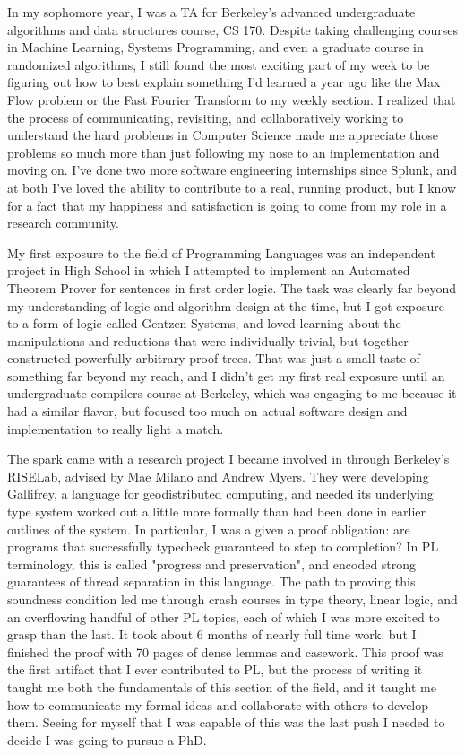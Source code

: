 \documentclass{nsf-grfp}
\begin{document}
In my sophomore year, I was a TA for Berkeley's advanced undergraduate algorithms and data structures course, CS 170. Despite taking challenging courses in Machine Learning, Systems Programming, and even a graduate course in randomized algorithms, I still found the most exciting part of my week to be figuring out how to best explain something I'd learned a year ago like the Max Flow problem or the Fast Fourier Transform to my weekly section. I realized that the process of communicating, revisiting, and collaboratively working to understand the hard problems in Computer Science made me appreciate those problems so much more than just following my nose to an implementation and moving on. I've done two more software engineering internships since Splunk, and at both I've loved the ability to contribute to a real, running product, but I know for a fact that my happiness and satisfaction is going to come from my role in a research community.

My first exposure to the field of Programming Languages was an independent project in High School in which I attempted to implement an Automated Theorem Prover for sentences in first order logic. The task was clearly far beyond my understanding of logic and algorithm design at the time, but I got exposure to a form of logic called Gentzen Systems, and loved learning about the manipulations and reductions that were individually trivial, but together constructed powerfully arbitrary proof trees. That was just a small taste of something far beyond my reach, and I didn't get my first real exposure until an undergraduate compilers course at Berkeley, which was engaging to me because it had a similar flavor, but focused too much on actual software design and implementation to really light a match. 

The spark came with a research project I became involved in through Berkeley's RISELab, advised by Mae Milano and Andrew Myers. They were developing Gallifrey, a language for geodistributed computing, and needed its underlying type system worked out a little more formally than had been done in earlier outlines of the system. In particular, I was a given a proof obligation: are programs that successfully typecheck guaranteed to step to completion? In PL terminology, this is called "progress and preservation", and encoded strong guarantees of thread separation in this language. The path to proving this soundness condition led me through crash courses in type theory, linear logic, and an overflowing handful of other PL topics, each of which I was more excited to grasp than the last. It took about 6 months of nearly full time work, but I finished the proof with 70 pages of dense lemmas and casework. This proof was the first artifact that I ever contributed to PL, but the process of writing it taught me both the fundamentals of this section of the field, and it taught me how to communicate my formal ideas and collaborate with others to develop them. Seeing for myself that I was capable of this was the last push I needed to decide I was going to pursue a PhD.
\end{document}
